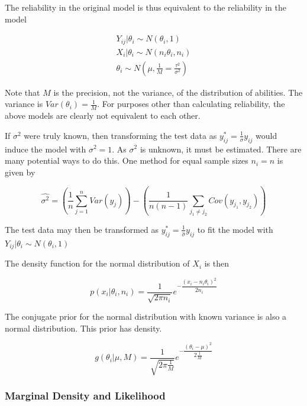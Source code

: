 \documentclass[12pt,epsfig]{article}
\begin{document}
The reliability in the original model is thus equivalent to the reliability in the model

\begin{equation*}
\begin{aligned}
    Y_{ij} | \theta_i \sim N(\theta_i, 1)\\
    X_{i} | \theta_i \sim N(n_i \theta_i, n_i)\\
    \theta_i \sim N\left(\mu, \frac{1}{M} = \frac{\tau^2}{\sigma^2}\right)
    \end{aligned}
\end{equation*}

\noindent Note that $M$ is the precision, not the variance, of the distribution of abilities. The variance is $Var(\theta_i) = \frac{1}{M}$. For purposes other than calculating reliability, the above models are clearly not equivalent to each other.


If $\sigma^2$ were truly known, then transforming the test data as $y_{ij}^* = \frac{1}{\sigma} y_{ij}$ would induce the model with $\sigma^2 = 1$. As $\sigma^2$ is unknown, it must be estimated. There are many potential ways to do this. One method for equal sample sizes $n_i = n$ is given by

\begin{equation*}
    \widehat{\sigma^2} = \left(\frac{1}{n} \sum_{j = 1}^{n} Var(y_j) \right) - \left(\frac{1}{n(n -1)} \sum_{j_1 \ne j_2} Cov(y_{j_1}, y_{j_2})  \right)   
\end{equation*}

\noindent The test data may then be transformed as $y_{ij}^* = \frac{1}{\hat{\sigma}} y_{ij}$ to fit the model with $Y_{ij} | \theta_i \sim N(\theta_i, 1)$

The density function for the normal distribution of $X_i$ is then

\begin{equation*}
    p(x_i | \theta_i, n_i) = \dfrac{1}{\sqrt{2 \pi n_i}} e^{-\dfrac{(x_i - n_i \theta_i)^2}{2n_i}}
\end{equation*}

The conjugate prior for the normal distribution with known variance is also a normal distribution. This prior has density.

\begin{equation*}
    g(\theta_i | \mu, M) = \dfrac{1}{\sqrt{2 \pi \frac{1}{M}}} e^{- \dfrac{(\theta_i - \mu)^2}{2 \frac1M}}
\end{equation*}

\subsubsection{Marginal Density and Likelihood}
\end{document}
